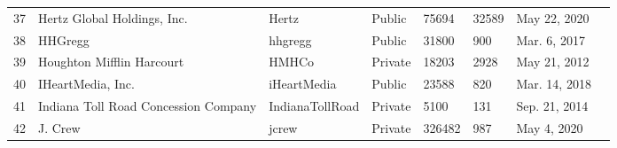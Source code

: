 \documentclass[9pt,twoside,lineno]{pnas-new}
\begin{document}
\begin{longtable}{llllllll}
37          & Hertz Global Holdings, Inc.         & Hertz                                                               & Public           & 75694              & 32589              & May 22, 2020                                                                                                                          \\
38          & HHGregg                                                                         & hhgregg                                                             & Public           & 31800              & 900                & Mar. 6, 2017                                                                                                                         \\
39          & Houghton Mifflin Harcourt                                                       & HMHCo                                                               & Private          & 18203              & 2928               & May 21, 2012                                                                                                                          \\
40          & IHeartMedia, Inc.                                                               & iHeartMedia                                                         & Public           & 23588              & 820                & Mar. 14, 2018                                                                                                                        \\
41          & Indiana Toll Road Concession Company                                                              & IndianaTollRoad                                                     & Private          & 5100               & 131                & Sep. 21, 2014                                                                                                                    \\
42          & J. Crew                                                                         & jcrew                                                               & Private          & 326482             & 987                & May 4, 2020                                                                                                                           \\

\end{longtable}
\end{document}
